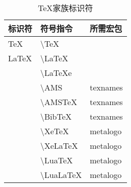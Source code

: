 \documentclass[UTF8,fontset=ubuntu]{ctexart}
\begin{document}
\begin{table}[H]
\begin{tabular}{l l l}
	\hline
	标识符 & 符号指令 & 所需宏包\\\hline
	\TeX & \textbackslash  TeX &\\
	\LaTeX & \textbackslash  LaTeX &\\
	\LaTeXe & \textbackslash  LaTeXe &\\
	\AMS & \textbackslash  AMS & texnames\\
	\AMSTeX & \textbackslash  AMSTeX & texnames\\
	\BibTeX & \textbackslash  BibTeX & texnames\\
	\XeTeX & \textbackslash  XeTeX & metalogo\\
	\XeLaTeX & \textbackslash  XeLaTeX & metalogo\\
	\LuaTeX & \textbackslash  LuaTeX & metalogo\\
	\LuaLaTeX & \textbackslash  LuaLaTeX & metalogo\\
	\hline
\end{tabular}
\caption{TeX家族标识符}
\end{table}
\end{document}
